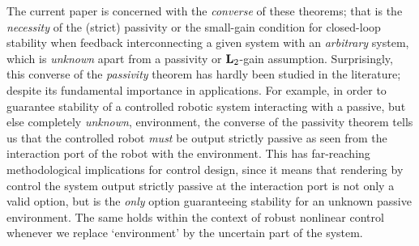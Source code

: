 \documentclass[11pt]{article}
\newcommand{\Ltwo}{\boldsymbol{\rm L}_{2}}
\begin{document}
The current paper is concerned with the {\it converse} of these theorems; that is the {\it necessity} of the (strict) passivity or the small-gain
condition for closed-loop stability when feedback interconnecting a given system with an {\it arbitrary} system, which is {\it unknown} apart from a
passivity or $\Ltwo$-gain assumption. Surprisingly, this converse of the {\it passivity} theorem has hardly been studied in the literature; despite its
fundamental importance in applications. For example, in order to guarantee stability of a controlled robotic system interacting with a passive, but else completely {\it unknown}, environment, the converse of the passivity theorem tells us that the controlled robot {\it must} be output strictly passive as seen from the interaction port of the robot with the environment. This has far-reaching methodological implications for control
design, since it means that rendering by control the system output strictly passive at the interaction port is not only a valid option, but is the {\it only} option guaranteeing stability for an unknown passive environment. The same holds within the context of robust nonlinear
control whenever we replace `environment' by the uncertain part of the system.
\end{document}
